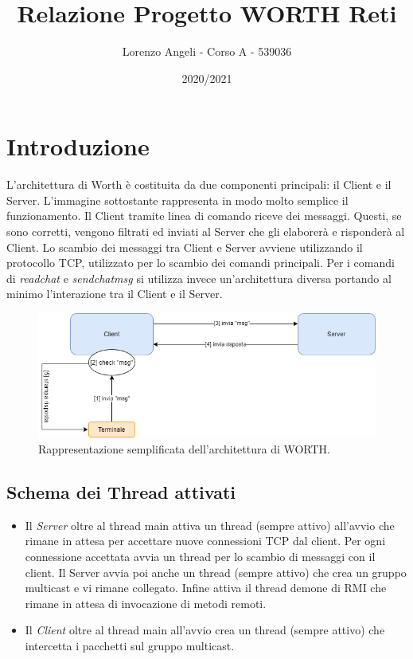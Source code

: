 \documentclass{article} %
\title{Relazione Progetto WORTH Reti}
\author{Lorenzo Angeli - Corso A - 539036}
\date{2020/2021}
\begin{document}
\maketitle

\section{Introduzione}
L’architettura di Worth è costituita da due componenti principali: il Client e il Server.
L'immagine sottostante rappresenta in modo molto semplice il funzionamento. Il Client tramite linea di comando riceve dei messaggi. Questi, se sono corretti, vengono filtrati ed inviati al Server che gli elaborerà e risponderà al Client. Lo scambio dei messaggi tra Client e Server avviene utilizzando il protocollo TCP, utilizzato per lo scambio dei comandi principali. Per i comandi di {\itshape readchat} e {\itshape sendchatmsg} si utilizza invece un'architettura diversa portando al minimo l'interazione tra il Client e il Server.
\begin{figure}[h]
\includegraphics[width=16cm]{Foto1}
\caption{Rappresentazione semplificata dell'architettura di WORTH.}
\label{fig:sidecap}
\end{figure}
\subsection{Schema dei Thread attivati}
\begin{itemize}
    \item Il {\itshape Server} oltre al thread main attiva un thread (sempre attivo) all'avvio che rimane in attesa per accettare nuove connessioni TCP dal client. Per ogni connessione accettata avvia un thread per lo scambio di messaggi con il client. Il Server avvia poi anche un thread (sempre attivo) che crea un gruppo multicast e vi rimane collegato. Infine attiva il thread demone di RMI che rimane in attesa di invocazione di metodi remoti.
    \item Il {\itshape Client} oltre al thread main all'avvio crea un thread (sempre attivo) che intercetta i pacchetti sul gruppo multicast.
\end{itemize}
\end{document}
